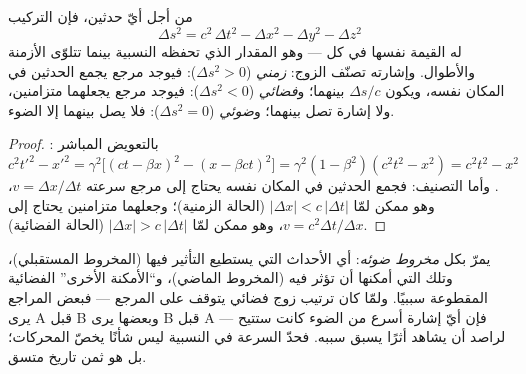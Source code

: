 \begin{theorem}\label{thm:b3:relativistic-kinematics:interval}
من أجل أيّ حدثين، فإن التركيب
\[
\Delta s^2 = c^2\,\Delta t^2 - \Delta x^2 - \Delta y^2 - \Delta z^2
\]
له القيمة نفسها في كل  --- وهو المقدار الذي تحفظه
النسبية بينما تتلوّى الأزمنة والأطوال. وإشارته تصنّف الزوج:
\emph{زمني} ($\Delta s^2 > 0$): فيوجد مرجع يجمع الحدثين في
المكان نفسه، ويكون $\Delta s/c$  بينهما؛
و\emph{فضائي} ($\Delta s^2 < 0$): فيوجد مرجع يجعلهما
متزامنين، ولا إشارة تصل بينهما؛ و\emph{ضوئي}
($\Delta s^2 = 0$): فلا يصل بينهما إلا الضوء.
\end{theorem}

\begin{proof}
بالتعويض المباشر :
$c^2t'^2 - x'^2 = \gamma^2\big[(ct - \beta x)^2 - (x - \beta ct)^2
\big] = \gamma^2(1 - \beta^2)(c^2t^2 - x^2) = c^2t^2 - x^2$.
وأما التصنيف: فجمع الحدثين في المكان نفسه يحتاج إلى
مرجع سرعته $v = \Delta x/\Delta t$، وهو ممكن لمّا $|\Delta x| <
c\,|\Delta t|$ (الحالة الزمنية)؛ وجعلهما متزامنين يحتاج إلى $v =
c^2\Delta t/\Delta x$، وهو ممكن لمّا $|\Delta x| > c\,|\Delta t|$
(الحالة الفضائية).
\end{proof}

\begin{remark}\label{rem:b3:relativistic-kinematics:causality}
يمرّ بكل  \emph{مخروط ضوئه}: أي الأحداث التي يستطيع
التأثير فيها (المخروط المستقبلي)، وتلك التي أمكنها أن تؤثر فيه
(المخروط الماضي)، و``الأمكنة الأخرى'' الفضائية المقطوعة سببيًا.
ولمّا كان ترتيب زوج فضائي يتوقف على المرجع --- فبعض المراجع يرى
A قبل B وبعضها يرى B قبل A --- فإن أيّ إشارة أسرع من الضوء
كانت ستتيح لراصد أن يشاهد أثرًا يسبق سببه. فحدّ السرعة في
النسبية ليس شأنًا يخصّ المحركات؛ بل هو ثمن تاريخ متسق.
\end{remark}

